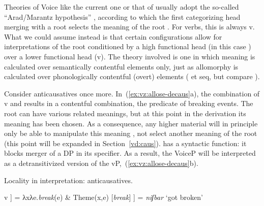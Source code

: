 \begin{exe}
\begin{xlist}
\begin{xlist}
\begin{exe}
\begin{xlist}
\begin{xlist}
\begin{exe}
\begin{xlist}
\begin{xlist}
\begin{exe}
\begin{exe}
\begin{xlist}
\begin{exe}
\begin{exe}
\begin{xlist}
\begin{exe}
\begin{exe}
\begin{exe}
\begin{exe}
\begin{exe}
\begin{xlist}
\begin{exe}
\begin{xlist}
\begin{exe}
\begin{exe}
\begin{xlist}
\begin{exe}
\begin{xlist}
\begin{exe}
\begin{xlist}
\begin{exe}
\begin{exe}
\begin{exe}
\begin{xlist}
\begin{exe}
\begin{exe}
Theories of Voice like the current one or that of \cite{layering15} usually adopt the so-called ``Arad/Marantz hypothesis'' \citep{elenasamioti14}, according to which the first categorizing head merging with a root selects the meaning of the root \citep{arad03,marantz13}. For verbs, this is always v. What we could assume instead is that certain configurations allow for interpretations of the root conditioned by a high functional head (in this case {\vz}) over a lower functional head (v). The theory involved is one in which meaning is calculated over semantically contentful elements only, just as allomorphy is calculated over phonologically contentful (overt) elements (\citealt{embick10} et seq, but compare \citealt{kastnermoskal18}).

Consider anticausatives once more. In~(\ref{ex:vz:allose-decaus}a), the combination of v and  results in a contentful combination, the predicate of breaking events. The root can have various related meanings, but at this point in the derivation its meaning has been chosen. As a consequence, any higher material will in principle only be able to manipulate this meaning \citep{arad03}, not select another meaning of the root (this point will be expanded in Section~\ref{vd:caus}). {\vz} has a syntactic function: it blocks merger of a DP in its specifier. As a result, the VoiceP will be interpreted as a detransitivized version of the vP,~(\ref{ex:vz:allose-decaus}b).

 \begin{exe}
 \ex  Locality in interpretation: anticausatives.\label{ex:vz:allose-decaus} 
 \begin{xlist} 
     \ex  {[}v ] = λxλe.\emph{break}(e) \& Theme(x,e) 
     \ex  {[}\textbf{\vz} [\emph{break}] ] = \emph{niʃbar} `got broken' 
 \z
\z 


\end{xlist}
\end{exe}
\end{exe}
\end{exe}
\end{xlist}
\end{exe}
\end{exe}
\end{exe}
\end{xlist}
\end{exe}
\end{xlist}
\end{exe}
\end{xlist}
\end{exe}
\end{exe}
\end{xlist}
\end{exe}
\end{xlist}
\end{exe}
\end{exe}
\end{exe}
\end{exe}
\end{exe}
\end{xlist}
\end{exe}
\end{exe}
\end{xlist}
\end{exe}
\end{exe}
\end{xlist}
\end{xlist}
\end{exe}
\end{xlist}
\end{xlist}
\end{exe}
\end{xlist}
\end{xlist}
\end{exe}
